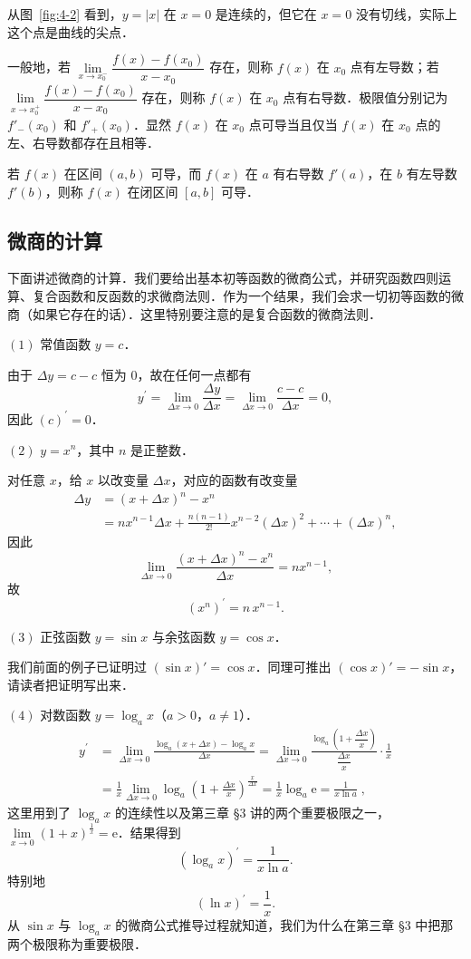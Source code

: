 从图~\ref{fig:4-2} 看到，$y = |x|$ 在 $x = 0$ 是连续的，但它在 $x = 0$ 没有切线，实际上这个点是曲线的尖点．

一般地，若 $\lim\limits_{x\to x_0^-}\dfrac{f(x)-f(x_0)}{x-x_0}$ 存在，则称 $f(x)$ 在 $x_0$ 点有左导数；若 $\lim\limits_{x\to x_0^+}\dfrac{f(x)-f(x_0)}{x-x_0}$ 存在，则称 $f(x)$ 在 $x_0$ 点有右导数．极限值分别记为 $f'_-(x_0)$ 和 $f'_+(x_0)$．显然 $f(x)$ 在 $x_0$ 点可导当且仅当 $f(x)$ 在 $x_0$ 点的左、右导数都存在且相等．

若 $f(x)$ 在区间 $(a, b)$ 可导，而 $f(x)$ 在 $a$ 有右导数 $f'(a)$，在 $b$ 有左导数 $f'(b)$，则称 $f(x)$ 在闭区间 $[a, b]$ 可导．

\subsection{微商的计算}

下面讲述微商的计算．我们要给出基本初等函数的微商公式，并研究函数四则运算、复合函数和反函数的求微商法则．作为一个结果，我们会求一切初等函数的微商（如果它存在的话）．这里特别要注意的是复合函数的微商法则．

$(1)$ 常值函数 $y = c$．

由于 $\Delta y = c - c$ 恒为 $0$，故在任何一点都有
\[
y^{\prime} = \lim_{\Delta x\to 0}\frac{\Delta y}{\Delta x} = \lim_{\Delta x\to 0}\frac{c - c}{\Delta x} = 0,
\]
因此 $\left(c\right)^{\prime} = 0$．

$(2)$ $y = x^n$，其中 $n$ 是正整数．

对任意 $x$，给 $x$ 以改变量 $\Delta x$，对应的函数有改变量
\[
\begin{aligned}
\Delta y &= \left(x+\Delta x\right)^n - x^n\\
&= nx^{n-1}\Delta x + \frac{n(n-1)}{2!}x^{n-2}(\Delta x)^2 + \cdots + \left(\Delta x\right)^n,
\end{aligned}
\]
因此
\[
\lim_{\Delta x\to 0}\frac{\left(x+\Delta x\right)^n - x^n}{\Delta x} = nx^{n-1},
\]
故
\[
\left(x^n\right)^{\prime} = n\,x^{n-1}.
\]

$(3)$ 正弦函数 $y = \sin x$ 与余弦函数 $y = \cos x$．

我们前面的例子已证明过 $\left(\sin x\right)' = \cos x$．同理可推出 $\left(\cos x\right)' = -\sin x$，请读者把证明写出来．

$(4)$ 对数函数 $y = \log_a x$（$a > 0$，$a \neq 1$）．
\[
\begin{aligned}
y^{\prime} &= \lim_{\Delta x\to 0}\frac{\log_a\left(x+\Delta x\right) - \log_a x}{\Delta x} = \lim_{\Delta x\to 0}\frac{\log_a\left(1+\dfrac{\Delta x}{x}\right)}{\dfrac{\Delta x}{x}}\cdot\frac{1}{x}\\
&= \frac{1}{x}\lim_{\Delta x\to 0}\log_a\left(1+\frac{\Delta x}{x}\right)^{\frac{x}{\Delta x}} = \frac{1}{x}\log_a\mathrm{e} = \frac{1}{x\ln a}\;,
\end{aligned}
\]
这里用到了 $\log_a x$ 的连续性以及第三章 §3 讲的两个重要极限之一，$\lim\limits_{x \to 0} (1 + x)^{\frac{1}{x}} = \mathrm{e}$．结果得到
\[
\left(\log_{a}x\right)^{\prime} = \frac{1}{x\ln a}.
\]
特别地
\[
\left(\ln x\right)^{\prime} = \frac{1}{x}.
\]
从 $\sin x$ 与 $\log_a x$ 的微商公式推导过程就知道，我们为什么在第三章 §3 中把那两个极限称为重要极限．

